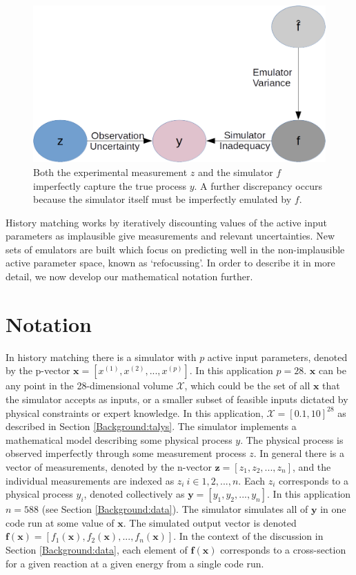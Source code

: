 \documentclass[
  12pt,
  a4paper,
  twoside]{book}
\begin{document}
\begin{figure}[H]

{\centering \includegraphics[width=0.8\linewidth]{figures/uncertanties_bigger} 

}

\caption{Both the experimental measurement $z$ and the simulator $f$ imperfectly capture the true process $y$. A further discrepancy occurs because the simulator itself must be imperfectly emulated by $f$.}\label{fig:uncertainty-sketch}
\end{figure}

History matching works by iteratively discounting values of the active input parameters as implausible give measurements and relevant uncertainties. New sets of emulators are built which focus on predicting well in the non-implausible active parameter space, known as `refocussing'. In order to describe it in more detail, we now develop our mathematical notation further.

\hypertarget{Intro-notation}{%
\section{Notation}\label{Intro-notation}}

In history matching there is a simulator with \(p\) active input parameters, denoted by the p-vector \(\mathbf{x} = [x^{(1)}, x^{(2)},...,x^{(p)}]\). In this application \(p=28\). \(\mathbf{x}\) can be any point in the 28-dimensional volume \(\mathcal{X}\), which could be the set of all \(\mathbf{x}\) that the simulator accepts as inputs, or a smaller subset of feasible inputs dictated by physical constraints or expert knowledge. In this application, \(\mathcal{X}=[0.1,10]^{28}\) as described in Section \ref{Background:talys}. The simulator implements a mathematical model describing some physical process \(y\). The physical process is observed imperfectly through some measurement process \(z\). In general there is a vector of measurements, denoted by the n-vector \(\mathbf{z} = [z_1,z_2,...,z_n]\), and the individual measurements are indexed as \(z_i~i \in 1,2,...,n\). Each \(z_i\) corresponds to a physical process \(y_i\), denoted collectively as \(\mathbf{y} = [y_1,y_2,...,y_n]\). In this application \(n=588\) (see Section \ref{Background:data}). The simulator simulates all of \(\mathbf{y}\) in one code run at some value of \(\mathbf{x}\). The simulated output vector is denoted \(\mathbf{f}(\mathbf{x})= [f_1(\mathbf{x}), f_2(\mathbf{x}),...,f_n(\mathbf{x}) ]\). In the context of the discussion in Section \ref{Background:data}, each element of \(\mathbf{f(x)}\) corresponds to a cross-section for a given reaction at a given energy from a single code run.
\end{document}

